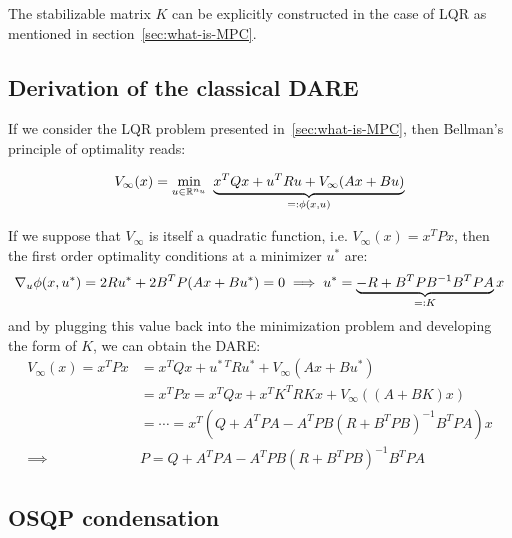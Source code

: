 \documentclass[12pt]{article}
\begin{document}
\begin{remark}
	The stabilizable matrix $K$ can be explicitly constructed in the case of LQR as mentioned in section~\ref{sec:what-is-MPC}.
\end{remark}

\subsection{Derivation of the classical DARE}\label{sec:DARE}

If we consider the LQR problem presented in~\ref{sec:what-is-MPC}, then Bellman's principle of optimality reads:

$$V_\infty(x)=\min_{u\in\mathbb{R}^{n_u}}~\underbrace{x^TQx+u^TRu+V_\infty(Ax+Bu)}_{=:\phi(x,u)}$$

If we suppose that $V_\infty$ is itself a quadratic function, i.e. $V_\infty(x)=x^TPx$, then the first order optimality conditions at a minimizer $u^*$ are:
$$\nabla_u\phi(x,u^*)=2Ru^*+2B^TP(Ax+Bu^*)=0\implies u^*=\underbrace{-R+B^TPB^{-1}B^TPA}_{=:K}x$$
and by plugging this value back into the minimization problem and developing the form of $K$, we can obtain the DARE:
\begin{align*}
	V_\infty(x)=x^TPx&=x^TQx+u^{*~T}Ru^*+V_\infty(Ax+Bu^*)\\
	&=x^TPx=x^TQx +x^TK^TRKx+V_\infty((A+BK)x)\\
	&=\cdots=x^T(Q+A^TPA-A^TPB(R+B^TPB)^{-1}B^TPA)x\\
	\implies&\boxed{P=Q+A^TPA-A^TPB(R+B^TPB)^{-1}B^TPA}
\end{align*}


\subsection{OSQP condensation}\label{sec:osqp-condensation}
\end{document}

